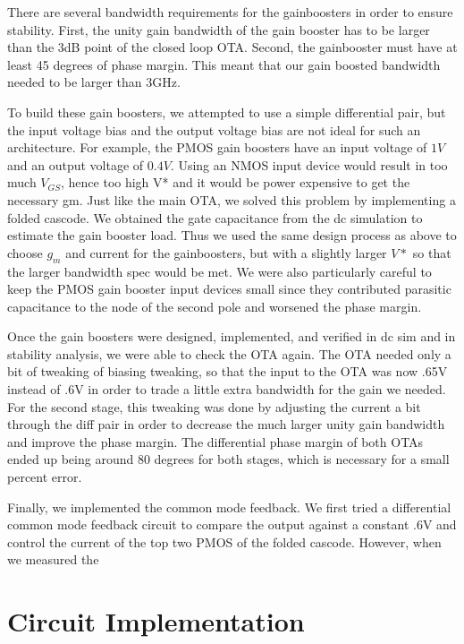 \documentclass[conference]{IEEEtran}
\begin{document}
There are several bandwidth requirements for the gainboosters in order to ensure stability. First, the unity gain bandwidth of the gain booster has to be larger than the 3dB point of the closed loop OTA. Second, the gainbooster must have at least 45 degrees of phase margin. This meant that our gain boosted bandwidth needed to be larger than 3GHz. 

To build these gain boosters, we attempted to use a simple differential pair, but the input voltage bias and the output voltage bias are not ideal for such an architecture. For example, the PMOS gain boosters have an input voltage of $1V$ and an output voltage of $0.4V$. Using an NMOS input device would result in too much $V_{GS}$, hence too high V* and it would be power expensive to get the necessary gm. Just like the main OTA, we solved this problem by implementing a folded cascode. We obtained the gate capacitance from the dc simulation to estimate the gain booster load. Thus we used the same design process as above to choose $g_m$ and current for the gainboosters, but with a slightly larger $V*$ so that the larger bandwidth spec would be met. We were also particularly careful to keep the PMOS gain booster input devices small since they contributed parasitic capacitance to the node of the second pole and worsened the phase margin.

Once the gain boosters were designed, implemented, and verified in dc sim and in stability analysis, we were able to check the OTA again. The OTA needed only a bit of tweaking of biasing tweaking, so that the input to the OTA was now .65V instead of .6V in order to trade a little extra bandwidth for the gain we needed. For the second stage, this tweaking was done by adjusting the current a bit through the diff pair in order to decrease the much larger unity gain bandwidth and improve the phase margin. The differential phase margin of both OTAs ended up being around 80 degrees for both stages, which is necessary for a small percent error.

Finally, we implemented the common mode feedback. We first tried a differential common mode feedback circuit to compare the output against a constant .6V and control the current of the top two PMOS of the folded cascode. However, when we measured the \\


\section{Circuit Implementation}
\end{document}
